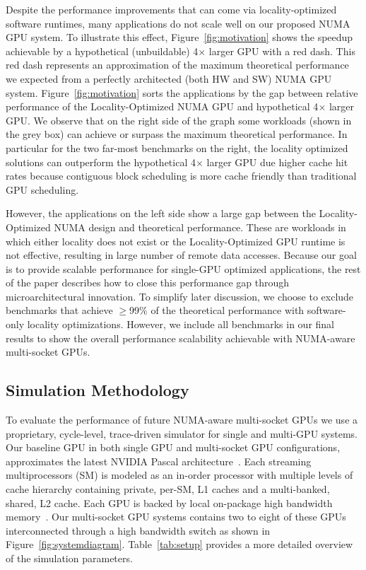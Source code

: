 Despite the performance improvements that can come via locality-optimized 
software runtimes, many applications do not scale well on our proposed NUMA 
GPU system. To illustrate this effect, Figure~\ref{fig:motivation} shows the speedup 
achievable by a hypothetical (unbuildable) 4$\times$ larger GPU with 
a red dash. This red dash represents an approximation of the 
maximum theoretical performance we expected from a perfectly architected 
(both HW and SW) NUMA GPU system. Figure~\ref{fig:motivation} sorts the 
applications by the gap between relative performance of the Locality-Optimized 
NUMA GPU and hypothetical 4$\times$ larger GPU. We observe that on the right 
side of the graph some workloads (shown in the grey box) can achieve or surpass 
the maximum theoretical performance. In particular for the two far-most 
benchmarks on the right, the locality optimized solutions can outperform the 
hypothetical 4$\times$ larger GPU due higher cache hit rates because contiguous block 
scheduling is more cache friendly than traditional GPU scheduling.

However, the applications on the left side show a large gap between the 
Locality-Optimized NUMA design and theoretical performance. These are workloads 
in which either locality does not exist or the Locality-Optimized GPU runtime is 
not effective, resulting in large number of remote data accesses. Because our goal is to provide scalable performance for single-GPU 
optimized applications, the rest of the paper describes how to close this 
performance gap through microarchitectural innovation. To simplify later 
discussion, we choose to exclude benchmarks that achieve $\geq$99\% of the 
theoretical performance with software-only locality optimizations. However, we include 
all benchmarks in our final results to show the overall performance scalability 
achievable with NUMA-aware multi-socket GPUs.
 
 \vspace{-.1in}
\subsection{Simulation Methodology}
\label{sec:methodology}

To evaluate the performance of future NUMA-aware multi-socket GPUs we use a 
proprietary, cycle-level, trace-driven simulator for single and multi-GPU 
systems. Our baseline GPU in both single GPU and multi-socket GPU 
configurations, approximates the latest NVIDIA Pascal 
architecture~\cite{pascal-tesla-wp}. Each streaming multiprocessors (SM) is 
modeled as an in-order processor with multiple levels of cache hierarchy 
containing private, per-SM, L1 caches and a multi-banked, shared, L2 cache. Each 
GPU is backed by local on-package high bandwidth memory~\cite{HBM}. Our 
multi-socket GPU systems contains two to eight of these GPUs interconnected 
through a high bandwidth switch as shown in Figure~\ref{fig:systemdiagram}. 
Table~\ref{tab:setup} provides a more detailed overview of the simulation 
parameters.

